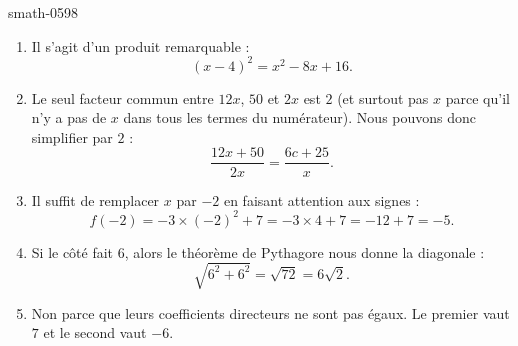 
\begin{corrige}{smath-0598}

    \begin{enumerate}
        \item
            Il s'agit d'un produit remarquable :
            \begin{equation}
                (x-4)^2=x^2-8x+16.
            \end{equation}
        \item
            Le seul facteur commun entre \( 12x\), \( 50\) et \( 2x\) est \( 2\) (et surtout pas \( x\) parce qu'il n'y a pas de \( x\) dans tous les termes du numérateur). Nous pouvons donc simplifier par \( 2\) :
            \begin{equation}
                \frac{ 12x+50 }{ 2x }=\frac{ 6c+25 }{ x }.
            \end{equation}
        \item
            Il suffit de remplacer \( x\) par \( -2\) en faisant attention aux signes :
            \begin{equation}
                f(-2)=-3\times (-2)^2+7=-3\times 4+7=-12+7=-5.
            \end{equation}
        \item
            Si le côté fait \unit{6}{\kilo\meter}, alors le théorème de Pythagore nous donne la diagonale :
            \begin{equation}
                \sqrt{6^2+6^2}=\sqrt{72}=6\sqrt{2}.
            \end{equation}
        \item
            Non parce que leurs coefficients directeurs ne sont pas égaux. Le premier vaut \( 7\) et le second vaut \( -6\).
    \end{enumerate}

\end{corrige}
